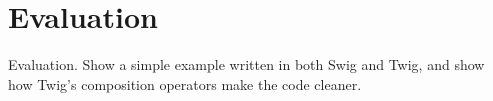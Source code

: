 
\section{Evaluation}

Evaluation. Show a simple example written in both Swig and Twig, and show how Twig's composition operators make the code cleaner.
